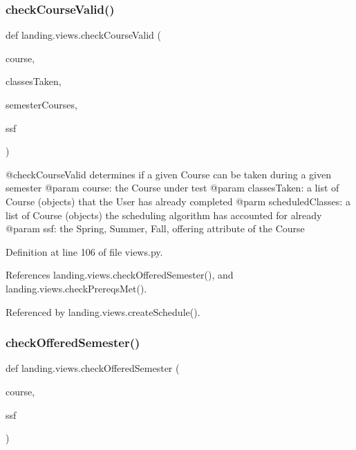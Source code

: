 \subsubsection{\texorpdfstring{check\+Course\+Valid()}{checkCourseValid()}}
{\footnotesize\ttfamily def landing.\+views.\+check\+Course\+Valid (\begin{DoxyParamCaption}\item[{}]{course,  }\item[{}]{classes\+Taken,  }\item[{}]{semester\+Courses,  }\item[{}]{ssf }\end{DoxyParamCaption})}

\begin{DoxyVerb}@checkCourseValid determines if a given Course can be taken during a given semester
@param course: the Course under test
@param classesTaken: a list of Course (objects) that the User has already completed
@parm scheduledClasses: a list of Course (objects) the scheduling algorithm has accounted for already
@param ssf: the Spring, Summer, Fall, offering attribute of the Course
\end{DoxyVerb}
 

Definition at line 106 of file views.\+py.



References landing.\+views.\+check\+Offered\+Semester(), and landing.\+views.\+check\+Prereqs\+Met().



Referenced by landing.\+views.\+create\+Schedule().

\mbox{\label{namespacelanding_1_1views_a2f54a8ff8d9bcec3589d12b6e7fb9b73}} 
\subsubsection{\texorpdfstring{check\+Offered\+Semester()}{checkOfferedSemester()}}
{\footnotesize\ttfamily def landing.\+views.\+check\+Offered\+Semester (\begin{DoxyParamCaption}\item[{}]{course,  }\item[{}]{ssf }\end{DoxyParamCaption})}

